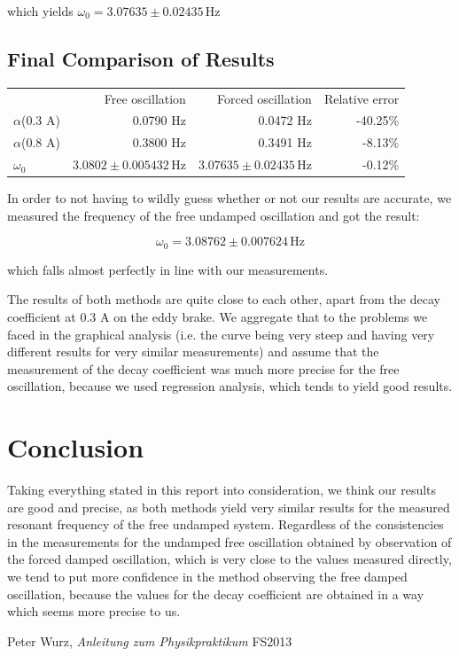 \documentclass{scrreprt}
\newcommand{\unit}[1]{\ensuremath{\, \mathrm{#1}}}
\begin{document}
which yields $\omega_0 = 3.07635 \pm 0.02435 \unit{Hz}$
\subsection{Final Comparison of Results}

\begin{table}[H]
\center
\begin{tabular}{lrrr}
&Free oscillation& Forced oscillation& Relative error\\
$\alpha$(0.3 A)& 0.0790 Hz & 0.0472 Hz & -40.25\%\\
$\alpha$(0.8 A)& 0.3800 Hz & 0.3491 Hz & -8.13\%\\
$\omega_0$&$3.0802 \pm 0.005432 \unit{Hz}$&$ 3.07635 \pm 0.02435 \unit{Hz}$ & -0.12\%\\
\end{tabular}
\end{table}

In order to not having to wildly guess whether or not our results are accurate, we measured the frequency of the free undamped oscillation and got the result:

\[\omega_0 = 3.08762 \pm 0.007624 \unit{Hz}\]

which falls almost perfectly in line with our measurements.

The results of both methods are quite close to each other, apart from the decay coefficient at 0.3 A on the eddy brake. We aggregate that to the problems we faced in the graphical analysis (i.e. the curve being very steep and having very different results for very similar measurements) and assume that the measurement of the decay coefficient was much more precise for the free oscillation, because we used regression analysis, which tends to yield good results. 

\section{Conclusion}

Taking everything stated in this report into consideration, we think our results are good and precise, as both methods yield very similar results for the measured resonant frequency of the free undamped system. Regardless of the consistencies in the measurements for the undamped free oscillation obtained by observation of the forced damped oscillation, which is very close to the values measured directly, we tend to put more confidence in the method observing the free damped oscillation, because the values for the decay coefficient are obtained in a way which seems more precise to us.


\begin{thebibliography}{9}

  Peter Wurz,
  \emph{Anleitung zum Physikpraktikum}
  FS2013

\end{thebibliography}
\end{document}
